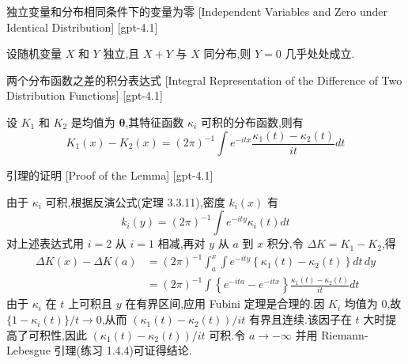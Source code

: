 \documentclass[UTF8]{ctexart}
\begin{document}
    
    
    \begin{thm}
        {独立变量和分布相同条件下的变量为零}
        [Independent Variables and Zero under Identical Distribution]
        [gpt-4.1]
        
设随机变量 $X$ 和 $Y$ 独立,且 $X + Y$ 与 $X$ 同分布,则 $Y = 0$ 几乎处处成立.

    \end{thm}
    
    
    
    \begin{lma}
        {两个分布函数之差的积分表达式}
        [Integral Representation of the Difference of Two Distribution Functions]
        [gpt-4.1]
        
设 $K_{1}$ 和 $K_{2}$ 是均值为 $\boldsymbol{\theta}$,其特征函数 $\kappa_{i}$ 可积的分布函数,则有
\[
K_{1}(x) - K_{2}(x) = (2\pi)^{-1} \int e^{-i t x} \frac{\kappa_{1}(t) - \kappa_{2}(t)}{i t} dt
\]

    \end{lma}
    
    
    
    \begin{prf}
        {引理的证明}
        [Proof of the Lemma]
        [gpt-4.1]
        
由于 $\kappa_{i}$ 可积,根据反演公式(定理 3.3.11),密度 $k_{i}(x)$ 有
\[
k_{i}(y) = (2\pi)^{-1} \int e^{-i t y} \kappa_{i}(t) dt
\]
对上述表达式用 $i=2$ 从 $i=1$ 相减,再对 $y$ 从 $a$ 到 $x$ 积分,令 $\Delta K = K_{1} - K_{2}$,得
\[
\begin{aligned}
\Delta K(x) - \Delta K(a) &= (2\pi)^{-1} \int_{a}^{x} \int e^{-i t y} \left\{ \kappa_{1}(t) - \kappa_{2}(t) \right\} dt\, dy \\
&= (2\pi)^{-1} \int \left\{ e^{-i t a} - e^{-i t x} \right\} \frac{\kappa_{1}(t) - \kappa_{2}(t)}{i t} dt
\end{aligned}
\]
由于 $\kappa_{i}$ 在 $t$ 上可积且 $y$ 在有界区间,应用 Fubini 定理是合理的.因 $K_{i}$ 均值为 0,故 $\{ 1 - \kappa_{i}(t) \} / t \to 0$,从而 $(\kappa_{1}(t) - \kappa_{2}(t)) / i t$ 有界且连续.该因子在 $t$ 大时提高了可积性,因此 $(\kappa_{1}(t) - \kappa_{2}(t)) / i t$ 可积.令 $a \to -\infty$ 并用 Riemann-Lebesgue 引理(练习 1.4.4)可证得结论.

    \end{prf}
    
\end{document}
